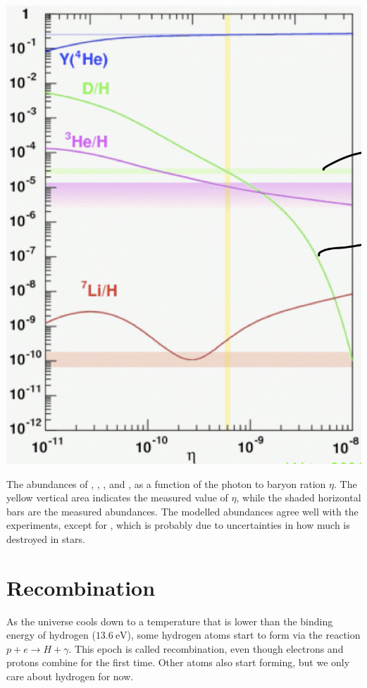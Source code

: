 \begin{marginfigure}
	\centering
	\includegraphics[width=\textwidth]{img/ch-02/nucleosynthesis.png}
	\caption{The abundances of , , , and , as a function of the photon to baryon ration $\eta$. The yellow vertical area indicates the measured value of $\eta$, while the shaded horizontal bars are the measured abundances. The modelled abundances agree well with the experiments, except for , which is probably due to uncertainties in how much  is destroyed in stars.}
	\label{fig:nucleosynthesis}
\end{marginfigure}


\section{Recombination}

As the universe cools down to a temperature that is lower than the binding energy of hydrogen ($\SI{13.6}{\eV}$), some hydrogen atoms start to form via the reaction $p + e \to H + \gamma$. This epoch is called recombination, even though electrons and protons combine for the first time. Other atoms also start forming, but we only care about hydrogen for now.


